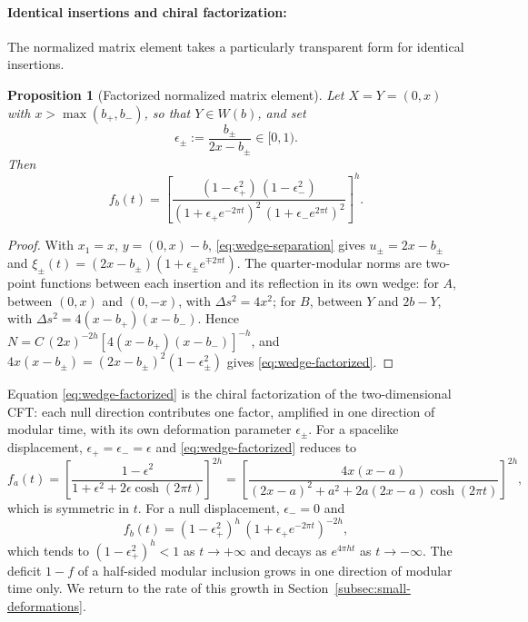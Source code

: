\documentclass[a4paper,11pt]{article}
\newtheorem{proposition}[theorem]{Proposition}
\theoremstyle{definition}
\begin{document}
\paragraph{Identical insertions and chiral factorization:}
The normalized matrix element takes a particularly transparent form for identical insertions.

\begin{proposition}[Factorized normalized matrix element]\label{prop:wedge-factorized}
Let $X=Y=(0,x)$ with $x>\max(b_+,b_-)$, so that $Y\in W(b)$, and set
\begin{equation}
 \epsilon_\pm:=\frac{b_\pm}{2x-b_\pm}\in[0,1).
\end{equation}
Then
\begin{equation}
 f_b(t)=\left[\frac{(1-\epsilon_+^2)\,(1-\epsilon_-^2)}{(1+\epsilon_+e^{-2\pi t})^2\,(1+\epsilon_-e^{2\pi t})^2}\right]^{h}.
 \label{eq:wedge-factorized}
\end{equation}
\end{proposition}
\begin{proof}
With $x_1=x$, $y=(0,x)-b$, \eqref{eq:wedge-separation} gives $u_\pm=2x-b_\pm$ and $\xi_\pm(t)=(2x-b_\pm)(1+\epsilon_\pm e^{\mp2\pi t})$. The quarter-modular norms are two-point functions between each insertion and its reflection in its own wedge: for $A$, between $(0,x)$ and $(0,-x)$, with $\Delta s^2=4x^2$; for $B$, between $Y$ and $2b-Y$, with $\Delta s^2=4(x-b_+)(x-b_-)$. Hence $N=C\,(2x)^{-2h}[4(x-b_+)(x-b_-)]^{-h}$, and $4x(x-b_\pm)=(2x-b_\pm)^2(1-\epsilon_\pm^2)$ gives \eqref{eq:wedge-factorized}.
\end{proof}

Equation \eqref{eq:wedge-factorized} is the chiral factorization of the two-dimensional CFT: each null direction contributes one factor, amplified in one direction of modular time, with its own deformation parameter $\epsilon_\pm$. For a spacelike displacement, $\epsilon_+=\epsilon_-=\epsilon$ and \eqref{eq:wedge-factorized} reduces to
\begin{equation}
 f_a(t)=\left[\frac{1-\epsilon^2}{1+\epsilon^2+2\epsilon\cosh(2\pi t)}\right]^{2h}
 =\left[\frac{4x(x-a)}{(2x-a)^2+a^2+2a(2x-a)\cosh(2\pi t)}\right]^{2h},
 \label{eq:normalized-small-wedge}
\end{equation}
which is symmetric in $t$. For a null displacement, $\epsilon_-=0$ and
\begin{equation}
 f_b(t)=(1-\epsilon_+^2)^h\,(1+\epsilon_+e^{-2\pi t})^{-2h},
 \label{eq:normalized-hsmi}
\end{equation}
which tends to $(1-\epsilon_+^2)^h<1$ as $t\to+\infty$ and decays as $e^{4\pi ht}$ as $t\to-\infty$. The deficit $1-f$ of a half-sided modular inclusion grows in one direction of modular time only. We return to the rate of this growth in Section~\ref{subsec:small-deformations}.
\end{document}
